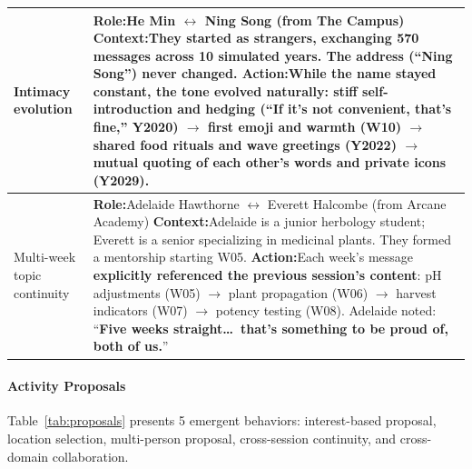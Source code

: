 \begin{table}[t]
\begin{tabular}{p{0.8in}p{4.3in}}
  Intimacy \newline evolution
  &
  \textbf{Role:}\quad He Min $\leftrightarrow$ Ning Song \hfill (from The Campus) \newline
  \textbf{Context:}\quad They started as strangers, exchanging \textbf{570 messages across 10 simulated years}. The address (``Ning Song'') never changed. \newline
  \textbf{Action:}\quad While the name stayed constant, \textbf{the tone evolved naturally}: stiff self-introduction and hedging (``If it's not convenient, that's fine,'' Y2020) $\to$ first emoji and warmth (W10) $\to$ shared food rituals and wave greetings (Y2022) $\to$ \textbf{mutual quoting of each other's words} and private icons (Y2029).
  \\
  \midrule
  
  Multi-week \newline topic \newline continuity
  &
  \textbf{Role:}\quad Adelaide Hawthorne $\leftrightarrow$ Everett Halcombe \hfill (from Arcane Academy) \newline
  \textbf{Context:}\quad Adelaide is a junior herbology student; Everett is a senior specializing in medicinal plants. They formed a mentorship starting W05. \newline
  \textbf{Action:}\quad Each week's message \textbf{explicitly referenced the previous session's content}: pH adjustments (W05) $\to$ plant propagation (W06) $\to$ harvest indicators (W07) $\to$ potency testing (W08). Adelaide noted: ``\textbf{Five weeks straight\ldots\ that's something to be proud of, both of us.}''
  \\
  \bottomrule
  \end{tabular}
  \end{table}

\paragraph{Activity Proposals}
Table~\ref{tab:proposals} presents 5 emergent behaviors:
interest-based proposal, location selection, multi-person proposal, cross-session continuity, and cross-domain collaboration.


